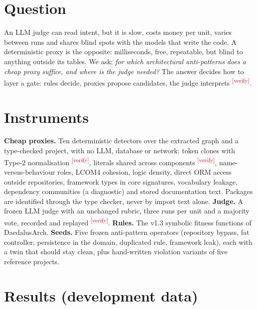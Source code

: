 \documentclass[10pt,a4paper]{article}
\newcommand{\citeneeded}[1]{\cite{#1}\textsuperscript{\textcolor{red}{\tiny[verify]}}}
\newcommand{\tool}{DaedalusArch}
\begin{document}
\section{Question}

An LLM judge can read intent, but it is slow, costs money per unit, varies between runs and shares blind spots with
the models that write the code. A deterministic proxy is the opposite: milliseconds, free, repeatable, but blind to
anything outside its tables. We ask: \emph{for which architectural anti-patterns does a cheap proxy suffice, and
where is the judge needed?} The answer decides how to layer a gate: rules decide, proxies propose candidates, the
judge interprets \citeneeded{garcez2023neurosymbolic}.

\section{Instruments}

\textbf{Cheap proxies.} Ten deterministic detectors over the extracted graph and a type-checked project, with no LLM,
database or network: token clones with Type-2 normalisation \citeneeded{roy2007clones,kamiya2002ccfinder}, literals
shared across components \citeneeded{fowler1999refactoring}, name-versus-behaviour roles, LCOM4 cohesion, logic
density, direct ORM access outside repositories, framework types in core signatures, vocabulary leakage,
dependency communities (a diagnostic) and stored documentation text. Packages are identified through the type checker, never by import text alone.
\textbf{Judge.} A frozen LLM judge with an unchanged rubric, three runs per unit and a majority vote, recorded and
replayed \citeneeded{zheng2023judging}. \textbf{Rules.} The v1.3 symbolic fitness functions of \tool{}.
\textbf{Seeds.} Five frozen anti-pattern operators (repository bypass, fat controller, persistence in the domain,
duplicated rule, framework leak), each with a twin that should stay clean, plus hand-written violation variants of
five reference projects. %

\section{Results (development data)}
\end{document}
